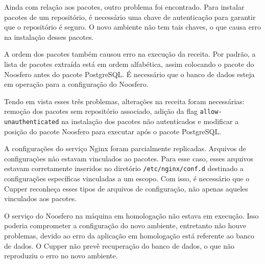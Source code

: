Ainda com relação aos pacotes, outro problema foi encontrado. Para instalar pacotes
de um repositório, é necessário uma chave de autenticação para garantir que o repositório
é seguro. O novo ambiente não tem tais chaves, o que causa erro na instalação desses
pacotes.

A ordem dos pacotes também causou erro na execução da receita. Por padrão, a lista de
pacotes extraída está em ordem alfabética, assim colocando o pacote do Noosfero antes
do pacote PostgreSQL. É necessário que o banco de dados esteja em operação para a
configuração do Noosfero.

Tendo em vista esses três problemas, alterações na receita foram necessárias:
remoção dos pacotes sem repositório associado, adição da flag \texttt{allow-unauthenticated}
na instalação dos pacotes não autenticados e modificar a posição do pacote Noosfero
para executar após o pacote PostgreSQL.

A configurações do serviço Nginx foram parcialmente replicadas. Arquivos de configurações
não estavam vinculados ao pacotes. Para esse caso, esses arquivos estavam corretamente
inseridos no diretório \texttt{/etc/nginx/conf.d} destinado a configurações específicas
vinculadas a um escopo. Com isso, é necessário que o Cupper reconheça esses tipos
de arquivos de configuração, não apenas aqueles vinculados aos pacotes.

O serviço do Noosfero na máquina em homologação não estava em execução. Isso poderia
comprometer a configuração do novo ambiente, entretanto não houve problemas, devido
ao erro da aplicação em homologação está referente ao banco de dados. O Cupper não
prevê recuperação do banco de dados, o que não reproduziu o erro no novo ambiente.



